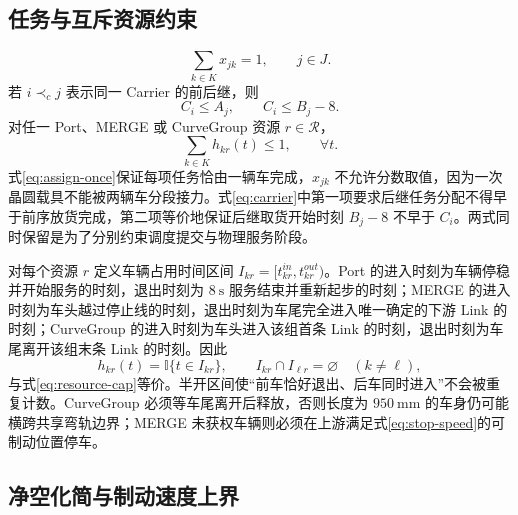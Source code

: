 \documentclass[UTF8]{ctexart}
\newcommand{\Res}{\mathcal{R}}
\begin{document}
\subsection{任务与互斥资源约束}
\begin{equation}\label{eq:assign-once}
\sum_{k\in K}x_{jk}=1,\qquad j\in J.
\end{equation}
若 $i\prec_c j$ 表示同一 Carrier 的前后继，则
\begin{equation}\label{eq:carrier}
C_i\le A_j,\qquad C_i\le B_j-8.
\end{equation}
对任一 Port、MERGE 或 CurveGroup 资源 $r\in\Res$，
\begin{equation}\label{eq:resource-cap}
\sum_{k\in K}h_{kr}(t)\le1,\qquad \forall t.
\end{equation}
式\eqref{eq:assign-once}保证每项任务恰由一辆车完成，$x_{jk}$ 不允许分数取值，因为一次晶圆载具不能被两辆车分段接力。式\eqref{eq:carrier}中第一项要求后继任务分配不得早于前序放货完成，第二项等价地保证后继取货开始时刻 $B_j-8$ 不早于 $C_i$。两式同时保留是为了分别约束调度提交与物理服务阶段。

对每个资源 $r$ 定义车辆占用时间区间 $I_{kr}=[t_{kr}^{in},t_{kr}^{out})$。Port 的进入时刻为车辆停稳并开始服务的时刻，退出时刻为 $8\ \mathrm{s}$ 服务结束并重新起步的时刻；MERGE 的进入时刻为车头越过停止线的时刻，退出时刻为车尾完全进入唯一确定的下游 Link 的时刻；CurveGroup 的进入时刻为车头进入该组首条 Link 的时刻，退出时刻为车尾离开该组末条 Link 的时刻。因此
\begin{equation}\label{eq:resource-interval}
h_{kr}(t)=\mathbb I\{t\in I_{kr}\},\qquad
I_{kr}\cap I_{\ell r}=\varnothing\quad(k\ne\ell),
\end{equation}
与式\eqref{eq:resource-cap}等价。半开区间使“前车恰好退出、后车同时进入”不会被重复计数。CurveGroup 必须等车尾离开后释放，否则长度为 $950\ \mathrm{mm}$ 的车身仍可能横跨共享弯轨边界；MERGE 未获权车辆则必须在上游满足式\eqref{eq:stop-speed}的可制动位置停车。

\subsection{净空化简与制动速度上界}
\end{document}
